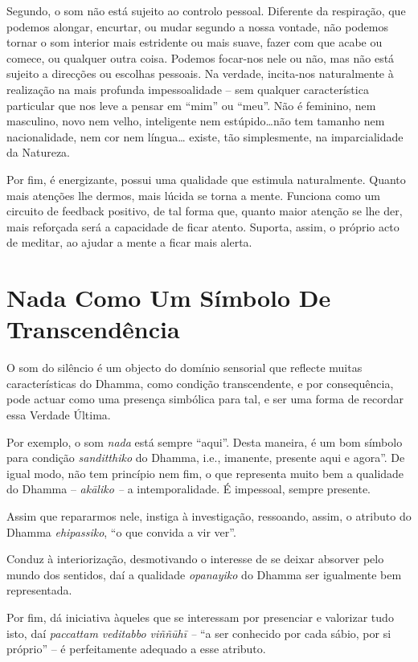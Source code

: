 Segundo, o som não está sujeito ao controlo pessoal. Diferente da
respiração, que podemos alongar, encurtar, ou mudar segundo a nossa
vontade, não podemos tornar o som interior mais estridente ou mais
suave, fazer com que acabe ou comece, ou qualquer outra coisa. Podemos
focar-nos nele ou não, mas não está sujeito a direcções ou escolhas
pessoais. Na verdade, incita-nos naturalmente à realização na mais
profunda impessoalidade -- sem qualquer característica particular que
nos leve a pensar em ``mim'' ou ``meu''. Não é feminino, nem masculino,
novo nem velho, inteligente nem estúpido\ldots{}não tem tamanho nem
nacionalidade, nem cor nem língua\ldots{} existe, tão simplesmente, na
imparcialidade da Natureza.

Por fim, é energizante, possui uma qualidade que estimula naturalmente.
Quanto mais atenções lhe dermos, mais lúcida se torna a mente. Funciona
como um circuito de feedback positivo, de tal forma que, quanto maior
atenção se lhe der, mais reforçada será a capacidade de ficar atento.
Suporta, assim, o próprio acto de meditar, ao ajudar a mente a ficar
mais alerta.

\section{Nada Como Um Símbolo De Transcendência}

O som do silêncio é um objecto do domínio sensorial que reflecte muitas
características do Dhamma, como condição transcendente, e por
consequência, pode actuar como uma presença simbólica para tal, e ser
uma forma de recordar essa Verdade Última.

Por exemplo, o som \emph{nada} está sempre ``aqui''. Desta maneira, é um
bom símbolo para condição \emph{sanditthiko} do Dhamma, i.e., imanente,
presente aqui e agora''. De igual modo, não tem princípio nem fim, o que
representa muito bem a qualidade do Dhamma -- \emph{akāliko --} a
intemporalidade. É impessoal, sempre presente.

Assim que repararmos nele, instiga à investigação, ressoando, assim, o
atributo do Dhamma \emph{ehipassiko}, ``o que convida a vir ver''.

Conduz à interiorização, desmotivando o interesse de se deixar absorver
pelo mundo dos sentidos, daí a qualidade \emph{opanayiko} do Dhamma ser
igualmente bem representada.

Por fim, dá iniciativa àqueles que se interessam por presenciar e
valorizar tudo isto, daí \emph{paccattam veditabbo viññūhī --} ``a ser
conhecido por cada sábio, por si próprio'' -- é perfeitamente adequado a
esse atributo.

